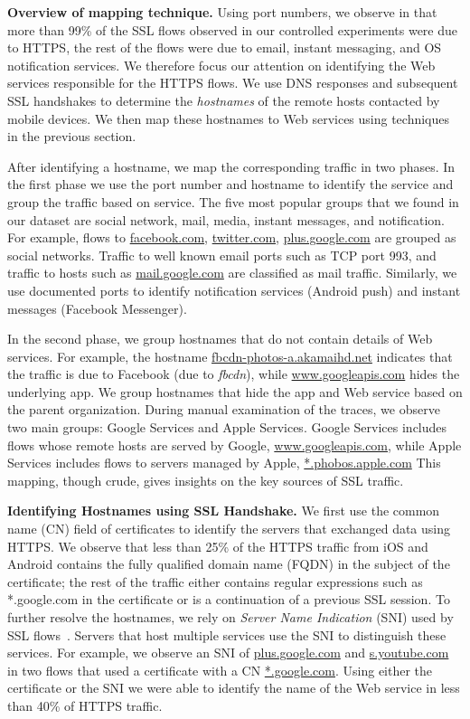\noindent\textbf{Overview of mapping technique.}
Using port numbers, we observe in that more than 99\% of the SSL flows observed in our controlled experiments were due to HTTPS, the rest of the flows were due to email, instant messaging, and OS notification services. 
We therefore focus our attention on identifying the Web services responsible for the HTTPS flows.
We use DNS responses and subsequent SSL handshakes to determine the 
\emph{hostnames} of the remote hosts contacted by mobile devices.
We then map these hostnames to Web services using techniques in the previous section.

After identifying a hostname, we map the corresponding traffic in two phases.
In the first phase we use the port number and hostname to identify the service 
and group the traffic based on service. 
The five most popular groups that we found in our dataset are social network, mail, media, instant messages, and notification.
For example, flows to \url{facebook.com}, \url{twitter.com}, \url{plus.google.com} are grouped as social networks.
Traffic to well known email ports such as TCP port 993, and traffic to hosts such as \url{mail.google.com} are classified as mail traffic.
Similarly, we use documented ports to identify notification services (Android push) and instant messages (Facebook Messenger).

In the second phase, we group hostnames that do not contain details of Web services.
For example, the hostname \url{fbcdn-photos-a.akamaihd.net} indicates that the traffic is due to Facebook (due to \emph{fbcdn}), while \url{www.googleapis.com} hides the underlying app.
We group hostnames that hide the app and Web service based on the parent organization.
During manual examination of the traces, we observe two main groups: Google Services and Apple Services.
Google Services includes flows whose remote hosts are served by Google, \eg \url{www.googleapis.com}, while Apple Services includes flows to servers managed by Apple, \eg \url{*.phobos.apple.com}
This mapping, though crude, gives insights on the key sources of SSL traffic.

\noindent\textbf{Identifying Hostnames using SSL Handshake.}
We first use the common name (CN) field of certificates to identify the servers that exchanged data using HTTPS.
We observe that less than 25\% of the HTTPS traffic from iOS and Android contains the fully qualified domain name (FQDN) in the subject of the certificate; the rest of the traffic either contains regular expressions such as *.google.com in the certificate or is a continuation of a previous SSL session. 
To further resolve the hostnames, we rely on \emph{Server Name Indication} (SNI) used by SSL flows~\cite{rfc:servernametls}.
Servers that host multiple services use the SNI to distinguish these services.   
For example, we observe an SNI of \url{plus.google.com} and \url{s.youtube.com} in two flows that used a certificate with a CN \url{*.google.com}.
Using either the certificate or the SNI we were able to identify the name of the Web service in less than 40\% of HTTPS traffic.

